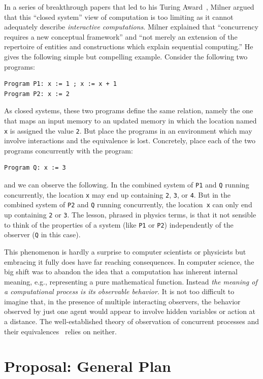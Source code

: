 \documentclass{article}
\theoremstyle{remark}
\begin{document}
In a series of breakthrough papers that led to his Turing
Award~\cite{Milner:1993:EIT:151233.151240}, Milner argued that this
``closed system'' view of computation is too limiting as it cannot
adequately describe \emph{interactive computations}. Milner explained
that ``concurrency requires a new conceptual framework'' and ``not
merely an extension of the repertoire of entities and constructions
which explain sequential computing.'' He gives the following simple
but compelling example. Consider the following two programs:
\begin{verbatim}
Program P1: x := 1 ; x := x + 1 
Program P2: x := 2
\end{verbatim}
As closed systems, these two programs define the same relation, namely
the one that maps an input memory to an updated memory in which the
location named \verb|x| is assigned the value \verb|2|. But place the
programs in an environment which may involve interactions and the
equivalence is lost. Concretely, place each of the two programs
concurrently with the program:
\begin{verbatim}
Program Q: x := 3
\end{verbatim}
and we can observe the following. In the combined system of \verb|P1|
and \verb|Q| running concurrently, the location \verb|x| may end up
containing \verb|2|, \verb|3|, or \verb|4|. But in the combined system
of \verb|P2| and \verb|Q| running concurrently, the location~\verb|x|
can only end up containing \verb|2| or \verb|3|. The lesson, phrased
in physics terms, is that it not sensible to think of the properties
of a system (like \verb|P1| or \verb|P2|) independently of the
observer (\verb|Q| in this case). 

This phenomenon is hardly a surprise to computer scientists or
physicists but embracing it fully does have far reaching
consequences. In computer science, the big shift was to abandon the
idea that a computation has inherent internal meaning, e.g.,
representing a pure mathematical function. Instead \emph{the meaning
  of a computational process is its observable behavior.} It is not
too difficult to imagine that, in the presence of multiple interacting
observers, the behavior observed by just one agent would appear to
involve hidden variables or action at a distance. The well-established
theory of observation of concurrent processes and their
equivalences~\cite{Hennessy1989} relies on neither.

\section{Proposal: General Plan} 
\end{document}
